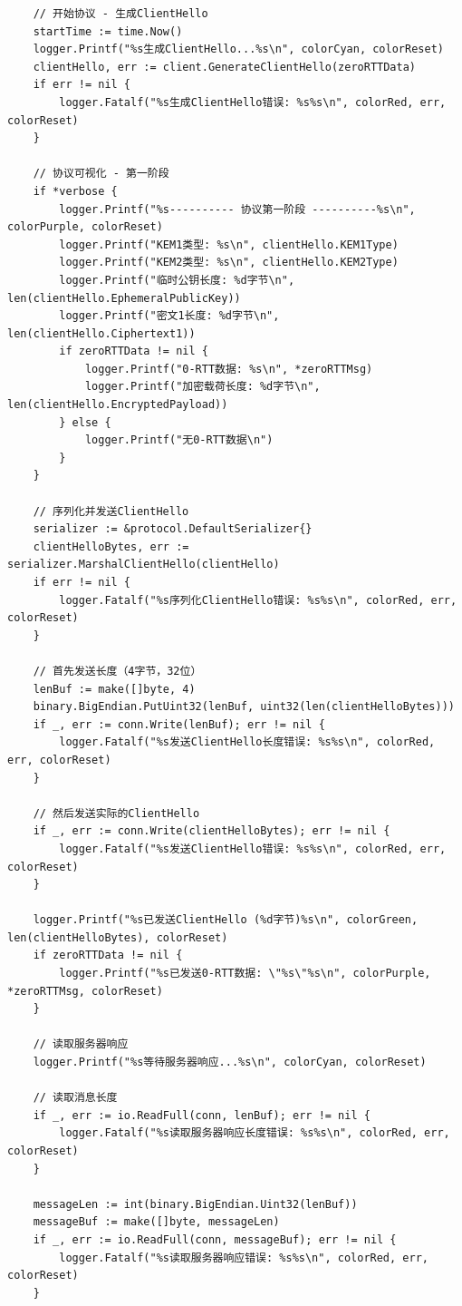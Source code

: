 \begin{verbatim}
    // 开始协议 - 生成ClientHello
    startTime := time.Now()
    logger.Printf("%s生成ClientHello...%s\n", colorCyan, colorReset)
    clientHello, err := client.GenerateClientHello(zeroRTTData)
    if err != nil {
        logger.Fatalf("%s生成ClientHello错误: %s%s\n", colorRed, err, colorReset)
    }

    // 协议可视化 - 第一阶段
    if *verbose {
        logger.Printf("%s---------- 协议第一阶段 ----------%s\n", colorPurple, colorReset)
        logger.Printf("KEM1类型: %s\n", clientHello.KEM1Type)
        logger.Printf("KEM2类型: %s\n", clientHello.KEM2Type)
        logger.Printf("临时公钥长度: %d字节\n", len(clientHello.EphemeralPublicKey))
        logger.Printf("密文1长度: %d字节\n", len(clientHello.Ciphertext1))
        if zeroRTTData != nil {
            logger.Printf("0-RTT数据: %s\n", *zeroRTTMsg)
            logger.Printf("加密载荷长度: %d字节\n", len(clientHello.EncryptedPayload))
        } else {
            logger.Printf("无0-RTT数据\n")
        }
    }

    // 序列化并发送ClientHello
    serializer := &protocol.DefaultSerializer{}
    clientHelloBytes, err := serializer.MarshalClientHello(clientHello)
    if err != nil {
        logger.Fatalf("%s序列化ClientHello错误: %s%s\n", colorRed, err, colorReset)
    }

    // 首先发送长度（4字节，32位）
    lenBuf := make([]byte, 4)
    binary.BigEndian.PutUint32(lenBuf, uint32(len(clientHelloBytes)))
    if _, err := conn.Write(lenBuf); err != nil {
        logger.Fatalf("%s发送ClientHello长度错误: %s%s\n", colorRed, err, colorReset)
    }

    // 然后发送实际的ClientHello
    if _, err := conn.Write(clientHelloBytes); err != nil {
        logger.Fatalf("%s发送ClientHello错误: %s%s\n", colorRed, err, colorReset)
    }

    logger.Printf("%s已发送ClientHello (%d字节)%s\n", colorGreen, len(clientHelloBytes), colorReset)
    if zeroRTTData != nil {
        logger.Printf("%s已发送0-RTT数据: \"%s\"%s\n", colorPurple, *zeroRTTMsg, colorReset)
    }

    // 读取服务器响应
    logger.Printf("%s等待服务器响应...%s\n", colorCyan, colorReset)

    // 读取消息长度
    if _, err := io.ReadFull(conn, lenBuf); err != nil {
        logger.Fatalf("%s读取服务器响应长度错误: %s%s\n", colorRed, err, colorReset)
    }

    messageLen := int(binary.BigEndian.Uint32(lenBuf))
    messageBuf := make([]byte, messageLen)
    if _, err := io.ReadFull(conn, messageBuf); err != nil {
        logger.Fatalf("%s读取服务器响应错误: %s%s\n", colorRed, err, colorReset)
    }


\end{verbatim}
